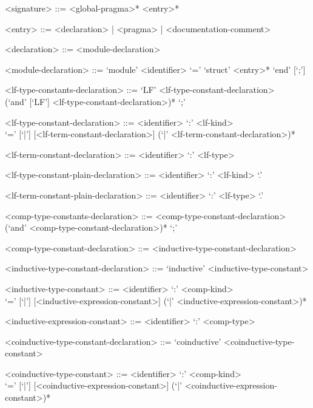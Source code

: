 \begin{grammar}
<signature> ::= <global-pragma>* <entry>*

<entry> ::= <declaration> | <pragma> | <documentation-comment>

<declaration> ::= <module-declaration>

<module-declaration> ::= `module' <identifier> `=' `struct' <entry>* `end' [`;']

<lf-type-constants-declaration> ::= `LF' <lf-type-constant-declaration>\\
(`and' [`LF'] <lf-type-constant-declaration>)* `;'

<lf-type-constant-declaration> ::= <identifier> `:' <lf-kind>\\
`=' [`|'] [<lf-term-constant-declaration>] (`|' <lf-term-constant-declaration>)*

<lf-term-constant-declaration> ::= <identifier> `:' <lf-type>

<lf-type-constant-plain-declaration> ::= <identifier> `:' <lf-kind> `.'

<lf-term-constant-plain-declaration> ::= <identifier> `:' <lf-type> `.'

<comp-type-constants-declaration> ::= <comp-type-constant-declaration>\\
(`and' <comp-type-constant-declaration>)* `;'

<comp-type-constant-declaration> ::= <inductive-type-constant-declaration>

<inductive-type-constant-declaration> ::= `inductive' <inductive-type-constant>

<inductive-type-constant> ::= <identifier> `:' <comp-kind>\\
`=' [`|'] [<inductive-expression-constant>] (`|' <inductive-expression-constant>)*

<inductive-expression-constant> ::= <identifier> `:' <comp-type>

<coinductive-type-constant-declaration> ::= `coinductive' <coinductive-type-constant>

<coinductive-type-constant> ::= <identifier> `:' <comp-kind>\\
`=' [`|'] [<coinductive-expression-constant>] (`|' <coinductive-expression-constant>)*


\end{grammar}
